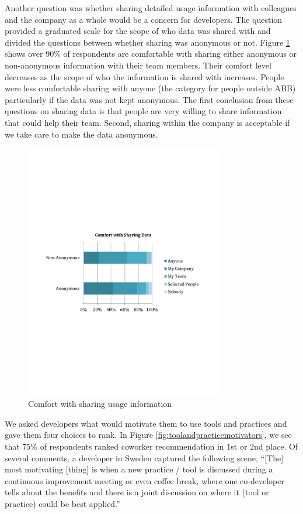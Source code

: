 \documentclass{sig-alternate}
\begin{document}
Another question was whether sharing detailed usage information with colleagues and the company as a whole would be a concern for developers.  The question provided a graduated scale for the scope of who data was shared with and divided the questions between whether sharing was anonymous or not. Figure \ref{fig:comfortwithsharing}  shows over 90\% of respondents are comfortable with sharing either anonymous or non-anonymous information with their team members. 
Their comfort level decreases as the scope of who the information is shared with increases.  People were less comfortable sharing with anyone (the category for people outside ABB) particularly if the data was not kept anonymous.  
The first conclusion from these questions on sharing data is that people are very willing to share information that could help their team. Second, sharing within the company is acceptable if we take care to make the data anonymous.

\begin{figure}
	\includegraphics[width=3.4in]{ComfortWithSharing.pdf}
	\caption{Comfort with sharing usage information}
	\label{fig:comfortwithsharing}
\end{figure}

We asked developers what would motivate them to use tools and practices and gave them four choices to rank.  In Figure \ref{fig:toolandpracticemotivators}, we see that 75\% of respondents ranked coworker recommendation in 1st or 2nd place.  Of several comments, a developer in Sweden captured the following scene, ``[The] most motivating [thing] is when a new practice / tool is discussed during a continuous improvement meeting or even coffee break, where one co-developer tells about the benefits and there is a joint discussion on where it (tool or practice) could be best applied.''  
\end{document}
